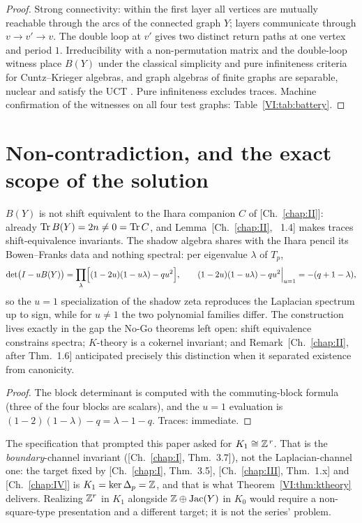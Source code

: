 \begin{proof}
Strong connectivity: within the first layer all vertices are mutually reachable
through the arcs of the connected graph $Y$; layers communicate through
$v\to v'\to v$. The double loop at $v'$ gives two distinct return paths at one
vertex and period $1$. Irreducibility with a non-permutation matrix and the
double-loop witness place $B(Y)$ under the classical simplicity and pure
infiniteness criteria for Cuntz--Krieger algebras, and graph algebras of finite
graphs are separable, nuclear and satisfy the UCT \cite{CK}. Pure infiniteness
excludes traces. Machine confirmation of the witnesses on all four test graphs:
Table~\ref{VI:tab:battery}.
\end{proof}

\section{Non-contradiction, and the exact scope of the solution}\label{VI:sec:scope}

\begin{proposition}\label{VI:prop:noncontra}
$B(Y)$ is not shift equivalent to the Ihara companion $C$ of {\rm[Ch.~\ref{chap:II}]}: already
$\operatorname{Tr} B(Y)=2n\neq0=\operatorname{Tr} C$, and Lemma~{\rm[Ch.~\ref{chap:II}, ~1.4]} makes traces shift-equivalence
invariants. The shadow algebra shares with the Ihara pencil its Bowen--Franks data
and nothing spectral: per eigenvalue $\lambda$ of $T_p$,
\[
\det\bigl(I-uB(Y)\bigr)=\prod_{\lambda}\Bigl[(1-2u)(1-u\lambda)-qu^{2}\Bigr],
\qquad
(1-2u)(1-u\lambda)-qu^{2}\Big|_{u=1}=-(q+1-\lambda),
\]
so the $u=1$ specialization of the shadow zeta reproduces the Laplacian spectrum up
to sign, while for $u\neq1$ the two polynomial families differ. The construction
lives exactly in the gap the No-Go theorems left open: shift equivalence constrains
spectra; $K$-theory is a cokernel invariant; and Remark~[Ch.~\ref{chap:II}, after Thm.~1.6]
anticipated precisely this distinction when it separated existence from canonicity.
\end{proposition}

\begin{proof}
The block determinant is computed with the commuting-block formula (three of the
four blocks are scalars), and the $u=1$ evaluation is
$(1-2)(1-\lambda)-q=\lambda-1-q$. Traces: immediate.
\end{proof}

\begin{remark}\label{VI:rem:k1}
The specification that prompted this paper asked for $K_1\cong\mathbb{Z}^{\,r}$. That is the
\emph{boundary}-channel invariant ([Ch.~\ref{chap:I}, Thm.~3.7]), not the Laplacian-channel one:
the target fixed by [Ch.~\ref{chap:I}, Thm.~3.5], [Ch.~\ref{chap:III}, Thm.~1.x] and [Ch.~\ref{chap:IV}] is
$K_1=\ker\Delta_p=\mathbb{Z}$, and that is what Theorem~\ref{VI:thm:ktheory} delivers.
Realizing $\mathbb{Z}^r$ in $K_1$ alongside $\mathbb{Z}\oplus\operatorname{Jac}(Y)$ in $K_0$ would require a
non-square-type presentation and a different target; it is not the series' problem.
\end{remark}

